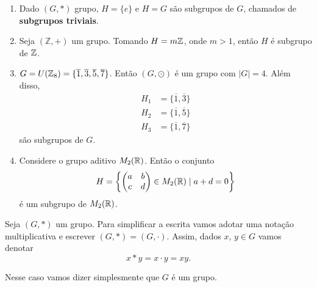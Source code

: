 \begin{exemplos}
    \begin{enumerate}[label={\arabic*})]
        \item Dado $(G,*)$ grupo, $H=\{e\}$ e $H=G$ s{\~a}o subgrupos de $G$, chamados de \textbf{subgrupos triviais}.

        \item Seja $(\mathbb{Z},+)$ um grupo. Tomando $H = m\mathbb{Z}$, onde $m > 1$, ent{\~a}o $H$ {\'e} subgrupo de $\mathbb{Z}$.

        \item $G = U(\mathbb{Z}_8) = \{\overline{1}, \overline{3}, \overline{5}, \overline{7}\}$. Ent\~ao $(G,\odot)$ {\'e} um grupo com $|G| = 4$. Al\'em disso,
        \begin{align*}
            H_1 &= \{\overline{1}, \overline{3}\}\\
            H_2 &= \{\overline{1}, \overline{5}\}\\
            H_3 &= \{\overline{1}, \overline{7}\}
        \end{align*}
        s\~ao subgrupos de $G$.

        \item Considere o grupo aditivo $M_2(\mathbb{R})$. Ent\~ao o conjunto
        \[
            H = \left\{\begin{pmatrix}
                a & b\\c & d
            \end{pmatrix} \in M_2(\mathbb{R}) \mid a + d = 0\right\}
        \]
        \'e um subgrupo de $M_2(\mathbb{R})$.
    \end{enumerate}
\end{exemplos}

Seja $(G, *)$ um grupo. Para simplificar a escrita vamos adotar uma nota\c{c}\~ao multiplicativa e escrever $(G, *) = (G, \cdot)$. Assim, dados $x$, $y \in G$ vamos denotar
\[
    x * y = x \cdot y = xy.
\]

Nesse caso vamos dizer simplesmente que $G$ \'e um grupo.

